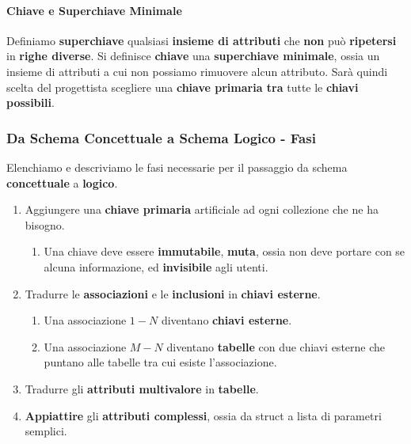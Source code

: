 \documentclass{article}
\begin{document}
\paragraph{Chiave e Superchiave Minimale} Definiamo \textbf{superchiave} qualsiasi \textbf{insieme di attributi} che \textbf{non} può \textbf{ripetersi} in \textbf{righe diverse}. Si definisce \textbf{chiave} una \textbf{superchiave minimale}, ossia un insieme di attributi a cui
non possiamo rimuovere alcun attributo. Sarà quindi scelta del progettista scegliere una \textbf{chiave primaria tra} tutte le \textbf{chiavi possibili}.

\subsubsection{Da Schema Concettuale a Schema Logico - Fasi}

Elenchiamo e descriviamo le fasi necessarie per il passaggio da schema \textbf{concettuale} a \textbf{logico}.

\begin{enumerate}
    \item Aggiungere una \textbf{chiave primaria} artificiale ad ogni collezione che ne ha bisogno.
    \begin{enumerate}
        \item Una chiave deve essere \textbf{immutabile}, \textbf{muta}, ossia non deve portare con se alcuna informazione, ed \textbf{invisibile} agli utenti.
    \end{enumerate}
    \item Tradurre le \textbf{associazioni} e le \textbf{inclusioni} in \textbf{chiavi esterne}.
    \begin{enumerate}
        \item Una associazione $1-N$ diventano \textbf{chiavi esterne}.
        \item Una associazione $M-N$ diventano \textbf{tabelle} con due chiavi esterne che puntano alle tabelle tra cui esiste l'associazione.
    \end{enumerate}
    \item Tradurre gli \textbf{attributi multivalore} in \textbf{tabelle}.
    \item \textbf{Appiattire} gli \textbf{attributi complessi}, ossia da struct a lista di parametri semplici.
\end{enumerate}

\end{document}
